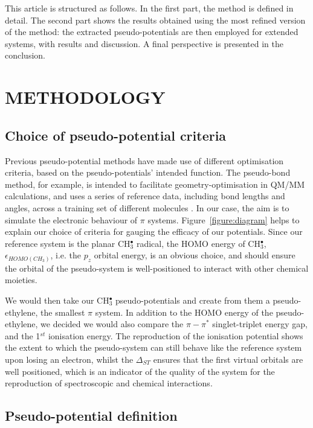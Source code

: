 \documentclass[12pt]{article}
\begin{document}
This article is structured as follows.
In the first part, the method is defined in detail.
The second part shows the results obtained using the most refined version of the method: the extracted pseudo-potentials are then employed for extended systems, with results and discussion. A final perspective is presented in the conclusion.

\section*{\sffamily \Large METHODOLOGY}

\subsection*{\sffamily \large Choice of pseudo-potential criteria \label{section:pseudocrit}} 

Previous pseudo-potential methods have made use of different optimisation criteria, based on the pseudo-potentials' intended function. 
The pseudo-bond method, for example, is intended to facilitate geometry-optimisation in QM/MM calculations, and uses a series of reference data, 
including bond lengths and angles, across a training set of different molecules \cite{zhang_pseudobond_1998}. 
In our case, the aim is to simulate the electronic behaviour of $\pi$ systems.
Figure~\ref{figure:diagram} helps to explain our choice of criteria for gauging the efficacy of our potentials. Since our reference system is the planar CH$_3^\bullet$ radical, the HOMO energy of CH$_3^{\bullet}$, $\epsilon_{HOMO(CH_3)}$, i.e. the $p_{z}$ orbital energy, is an obvious choice, and should ensure the orbital of the pseudo-system is well-positioned to interact with other chemical moieties.

We would then take our CH$_3^{\bullet}$ pseudo-potentials and create from them a pseudo-ethylene, the smallest $\pi$ system.
In addition to the HOMO energy of the pseudo-ethylene, we decided we would also compare the $\pi-\pi^{*}$ singlet-triplet energy gap, 
and the 1$^{st}$ ionisation energy. The reproduction of the ionisation potential shows the extent to which the pseudo-system 
can still behave like the reference system upon losing an electron, whilst the $\Delta_{ST}$ ensures that the first virtual 
orbitals are well positioned, which is an indicator of the quality of the system for the reproduction of spectroscopic and 
chemical interactions.

\subsection*{\sffamily \large Pseudo-potential definition} \label{secpotdef}
\end{document}
